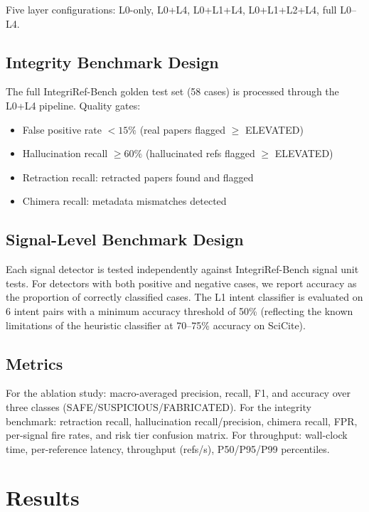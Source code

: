 \documentclass[sigconf,nonacm]{acmart}
\begin{document}
Five layer configurations: L0-only, L0+L4, L0+L1+L4, L0+L1+L2+L4, full L0--L4.

\subsection{Integrity Benchmark Design}

The full IntegriRef-Bench golden test set (58 cases) is processed through the L0+L4 pipeline.
Quality gates:

\begin{itemize}[leftmargin=*]
    \item False positive rate $< 15\%$ (real papers flagged $\geq$ ELEVATED)
    \item Hallucination recall $\geq 60\%$ (hallucinated refs flagged $\geq$ ELEVATED)
    \item Retraction recall: retracted papers found and flagged
    \item Chimera recall: metadata mismatches detected
\end{itemize}

\subsection{Signal-Level Benchmark Design}

Each signal detector is tested independently against IntegriRef-Bench signal unit tests.
For detectors with both positive and negative cases, we report accuracy as the proportion of correctly classified cases.
The L1 intent classifier is evaluated on 6 intent pairs with a minimum accuracy threshold of 50\% (reflecting the known limitations of the heuristic classifier at 70--75\% accuracy on SciCite).

\subsection{Metrics}

For the ablation study: macro-averaged precision, recall, F1, and accuracy over three classes (SAFE/SUSPICIOUS/FABRICATED).
For the integrity benchmark: retraction recall, hallucination recall/precision, chimera recall, FPR, per-signal fire rates, and risk tier confusion matrix.
For throughput: wall-clock time, per-reference latency, throughput (refs/s), P50/P95/P99 percentiles.

\section{Results}
\label{sec:results}
\end{document}
